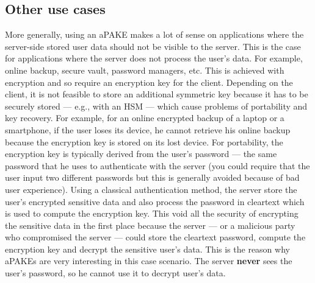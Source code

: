 \documentclass[../report.tex]{subfiles}
\begin{document}
\subsection{Other use cases}
More generally, using an aPAKE makes a lot of sense on applications where the server-side stored user data should not be visible to the server.  This is the case for applications where the server does not process the user's data. For example, online backup, secure vault, password managers, etc. This is achieved with encryption and so require an encryption key for the client.
Depending on the client, it is not feasible to store an additional symmetric key because it has to be securely stored --- e.g., with an HSM --- which cause problems of portability and key recovery. For example, for an online encrypted backup of a laptop or a smartphone, if the user loses its device, he cannot retrieve his online backup because the encryption key is stored on its lost device.
For portability, the encryption key is typically derived from the user's password --- the same password that he uses to authenticate with the server (you could require that the user input two different passwords but this is generally avoided because of bad user experience). Using a classical authentication method, the server store the user's encrypted sensitive data and also process the password in cleartext which is used to compute the encryption key. This void all the security of encrypting the sensitive data in the first place because the server --- or a malicious party who compromised the server --- could store the cleartext password, compute the encryption key and decrypt the sensitive user's data.
This is the reason why aPAKEs are very interesting in this case scenario. The server \textbf{never} sees the user's password, so he cannot use it to decrypt user’s data.







\end{document}

